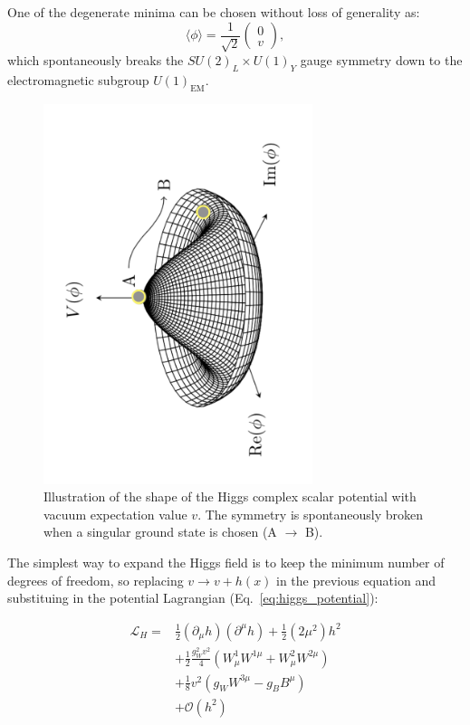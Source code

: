 One of the degenerate minima can be chosen without loss of generality as:
\begin{equation}
\langle \phi \rangle = \frac{1}{\sqrt{2}} \begin{pmatrix}
0 \\
v
\end{pmatrix},
\end{equation}
which spontaneously breaks the $SU(2)_L \times U(1)_Y$ gauge symmetry down to the electromagnetic subgroup $U(1)_{\text{EM}}$.

\begin{figure}[htbp]
  \centering
  \includegraphics[angle=-90,width=0.7\textwidth]{images/mexican_hat.pdf}
  \caption{Illustration of the shape of the Higgs complex scalar potential with vacuum expectation value $v$. The symmetry is spontaneously broken when a singular ground state is chosen (A $\rightarrow$ B).}
  \label{fig:mexican_hat}
\end{figure}

The simplest way to expand the Higgs field is to keep the minimum number of degrees of freedom, so replacing $v\rightarrow v+h(x)$ in the previous equation and substituing in the potential Lagrangian (Eq.~\ref{eq:higgs_potential}): 

\begin{equation}
\begin{split}
\mathcal{L}_{H} = 
&\frac{1}{2}(\partial_{\mu}h)(\partial^{\mu}h) + \frac{1}{2}(2\mu^2)h^2\\  
& + \frac{1}{2}\frac{g^2_{W}v^2}{4}(W_{\mu}^1W^{1\mu}+W_{\mu}^2W^{2\mu})\\
& +\frac{1}{8}v^2(g_{W}W^{3\mu}-g_{B}B^{\mu})\\ 
& + \mathcal{O}(h^2)
\end{split} 
\label{eq:ew_broken}
\end{equation}

